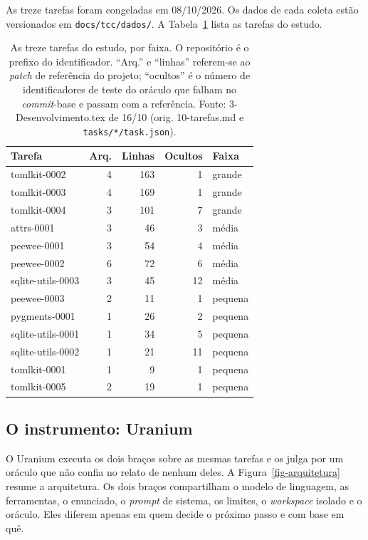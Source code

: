 As treze tarefas foram congeladas em 08/10/2026. Os dados de cada coleta estão versionados em \texttt{docs/tcc/dados/}. A Tabela~\ref{tab-tarefas} lista as tarefas do estudo.

\begin{table}[ht!]
\centering
\caption{As treze tarefas do estudo, por faixa. O repositório é o prefixo do identificador. ``Arq.'' e ``linhas'' referem-se ao \textit{patch} de referência do projeto; ``ocultos'' é o número de identificadores de teste do oráculo que falham no \textit{commit}-base e passam com a referência. Fonte: 3-Desenvolvimento.tex de 16/10 (orig. 10-tarefas.md e \texttt{tasks/*/task.json}).}
\label{tab-tarefas}
\footnotesize
\begin{tabular}{lrrrl}
\toprule
Tarefa & Arq. & Linhas & Ocultos & Faixa \\
\midrule
tomlkit-0002 & 4 & 163 & 1 & grande \\
tomlkit-0003 & 4 & 169 & 1 & grande \\
tomlkit-0004 & 3 & 101 & 7 & grande \\
attrs-0001 & 3 & 46 & 3 & média \\
peewee-0001 & 3 & 54 & 4 & média \\
peewee-0002 & 6 & 72 & 6 & média \\
sqlite-utils-0003 & 3 & 45 & 12 & média \\
peewee-0003 & 2 & 11 & 1 & pequena \\
pygments-0001 & 1 & 26 & 2 & pequena \\
sqlite-utils-0001 & 1 & 34 & 5 & pequena \\
sqlite-utils-0002 & 1 & 21 & 11 & pequena \\
tomlkit-0001 & 1 & 9 & 1 & pequena \\
tomlkit-0005 & 2 & 19 & 1 & pequena \\
\bottomrule
\end{tabular}
\end{table}

\subsection{O instrumento: Uranium}
\label{ssec:uranium}

O Uranium executa os dois braços sobre as mesmas tarefas e os julga por um oráculo que não confia no relato de nenhum deles. A Figura~\ref{fig-arquitetura} resume a arquitetura. Os dois braços compartilham o modelo de linguagem, as ferramentas, o enunciado, o \textit{prompt} de sistema, os limites, o \textit{workspace} isolado e o oráculo. Eles diferem apenas em quem decide o próximo passo e com base em quê.

